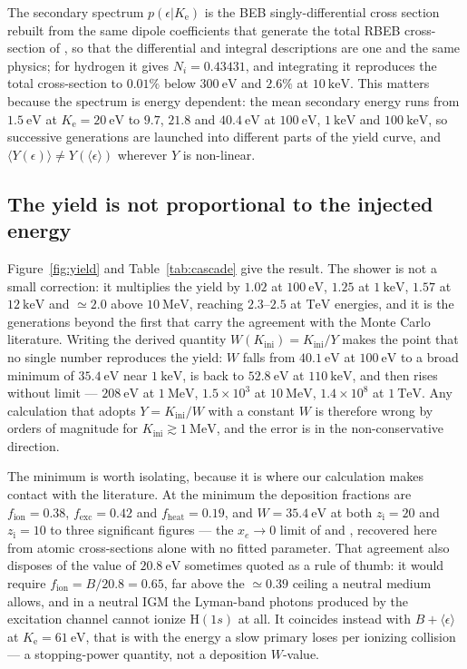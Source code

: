 \documentclass[twocolumn]{article}
\newcommand{\Ke}{K_{\mathrm{e}}}
\newcommand{\Kini}{K_{\mathrm{ini}}}
\newcommand{\zi}{z_{\mathrm{i}}}
\begin{document}
The secondary spectrum $p(\epsilon|\Ke)$ is the BEB singly-differential cross
section \citep{KimRudd1994} rebuilt from the same dipole coefficients that
generate the total RBEB cross-section of \citet{Kim2000}, so that the
differential and integral descriptions are one and the same physics; for
hydrogen it gives $N_i = 0.43431$, and integrating it reproduces the total
cross-section to $0.01\%$ below $300\ \mathrm{eV}$ and $2.6\%$ at
$10\ \mathrm{keV}$. This matters because the spectrum is energy dependent:
the mean secondary energy runs from $1.5\ \mathrm{eV}$ at
$\Ke = 20\ \mathrm{eV}$ to $9.7$, $21.8$ and $40.4\ \mathrm{eV}$ at $100\
\mathrm{eV}$, $1\ \mathrm{keV}$ and $100\ \mathrm{keV}$, so successive
generations are launched into different parts of the yield curve, and
$\langle Y(\epsilon)\rangle \ne Y(\langle\epsilon\rangle)$ wherever $Y$ is
non-linear.

\subsection{The yield is not proportional to the injected energy}

Figure~\ref{fig:yield} and Table~\ref{tab:cascade} give the result. The shower
is not a small correction: it multiplies the yield by $1.02$ at
$100\ \mathrm{eV}$, $1.25$ at $1\ \mathrm{keV}$, $1.57$ at $12\ \mathrm{keV}$
and $\simeq\!2.0$ above $10\ \mathrm{MeV}$, reaching $2.3$--$2.5$ at
$\mathrm{TeV}$ energies, and it is the generations beyond the first that carry
the agreement with the Monte Carlo literature. Writing the derived quantity
$W(\Kini) = \Kini/Y$ makes the point that no single number reproduces the
yield: $W$ falls from $40.1\ \mathrm{eV}$ at $100\ \mathrm{eV}$ to a broad
minimum of $35.4\ \mathrm{eV}$ near $1\ \mathrm{keV}$, is back to
$52.8\ \mathrm{eV}$ at $110\ \mathrm{keV}$, and then rises without limit ---
$208\ \mathrm{eV}$ at $1\ \mathrm{MeV}$, $1.5\times10^{3}$ at
$10\ \mathrm{MeV}$, $1.4\times10^{8}$ at $1\ \mathrm{TeV}$. Any calculation
that adopts $Y = \Kini/W$ with a constant $W$ is therefore wrong by orders of
magnitude for $\Kini \gtrsim 1\ \mathrm{MeV}$, and the error is in the
non-conservative direction.

The minimum is worth isolating, because it is where our calculation makes
contact with the literature. At the minimum the deposition fractions are
$f_{\mathrm{ion}} = 0.38$, $f_{\mathrm{exc}} = 0.42$ and
$f_{\mathrm{heat}} = 0.19$, and $W = 35.4\ \mathrm{eV}$ at both $\zi = 20$ and
$\zi = 10$ to three significant figures --- the $x_e \rightarrow 0$ limit of
\citet{Shull1985} and \citet{Furlanetto2010}, recovered here from atomic
cross-sections alone with no fitted parameter. That agreement also disposes of
the value of $20.8\ \mathrm{eV}$ sometimes quoted as a rule of thumb: it would
require $f_{\mathrm{ion}} = B/20.8 = 0.65$, far above the $\simeq\!0.39$
ceiling a neutral medium allows, and in a neutral IGM the Lyman-band photons
produced by the excitation channel cannot ionize $\mathrm{H}(1s)$ at all.
It coincides instead with $B + \langle\epsilon\rangle$ at
$\Ke = 61\ \mathrm{eV}$, that is with the energy a slow primary loses per
ionizing collision --- a stopping-power quantity, not a deposition
$W$-value.
\end{document}

